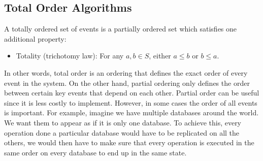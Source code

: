 \subsection{Total Order Algorithms}
A totally ordered set of events is a partially ordered set which satisfies one additional property:
\begin{itemize}
	\item Totality (trichotomy law): For any $a, b \in S$, either $a \leq b$  or $b \leq a$.
\end{itemize}
\par
In other words, total order is an ordering that defines the exact order of every event in the system. On the other hand, partial ordering only defines the order between certain key events that depend on each other. Partial order can be useful since it is less costly to implement. However, in some cases the order of all events is important. For example, imagine we have multiple databases around the world. We want them to appear as if it is only one database. To achieve this, every operation done a particular database would have to be replicated on all the others, we would then have to make sure that every operation is executed in the same order on every database to end up in the same state. 
